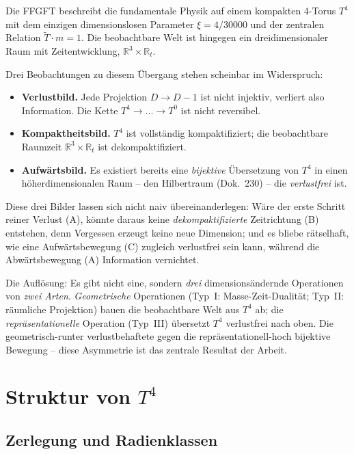 Die FFGFT beschreibt die fundamentale Physik auf einem kompakten 4-Torus $T^4$
mit dem einzigen dimensionslosen Parameter $\xi = 4/30000$ und der zentralen
Relation $\tilde{T}\cdot m = 1$. Die beobachtbare Welt ist hingegen ein
dreidimensionaler Raum mit Zeitentwicklung, $\mathbb{R}^3 \times \mathbb{R}_t$.

Drei Beobachtungen zu diesem \"Ubergang stehen scheinbar im Widerspruch:
\begin{itemize}
  \item[(A)] \textbf{Verlustbild.} Jede Projektion $D{\to}D{-}1$ ist nicht
  injektiv, verliert also Information. Die Kette $T^4 \to \dots \to T^0$ ist
  nicht reversibel.
  \item[(B)] \textbf{Kompaktheitsbild.} $T^4$ ist vollst\"andig kompaktifiziert;
  die beobachtbare Raumzeit $\mathbb{R}^3 \times \mathbb{R}_t$ ist
  dekompaktifiziert.
  \item[(C)] \textbf{Aufw\"artsbild.} Es existiert bereits eine \emph{bijektive}
  \"Ubersetzung von $T^4$ in einen h\"oherdimensionalen Raum -- den Hilbertraum
  (Dok.~230) -- die \emph{verlustfrei} ist.
\end{itemize}

Diese drei Bilder lassen sich nicht naiv \"ubereinanderlegen: W\"are der erste
Schritt reiner Verlust (A), k\"onnte daraus keine \emph{dekompaktifizierte}
Zeitrichtung (B) entstehen, denn Vergessen erzeugt keine neue Dimension; und es
bliebe r\"atselhaft, wie eine Aufw\"artsbewegung (C) zugleich verlustfrei sein
kann, w\"ahrend die Abw\"artsbewegung (A) Information vernichtet.

Die Aufl\"osung: Es gibt nicht eine, sondern \emph{drei} dimensions\"andernde
Operationen von \emph{zwei Arten}. \emph{Geometrische} Operationen (Typ~I:
Masse-Zeit-Dualit\"at; Typ~II: r\"aumliche Projektion) bauen die beobachtbare
Welt aus $T^4$ ab; die \emph{repr\"asentationelle} Operation (Typ~III)
\"ubersetzt $T^4$ verlustfrei nach oben. Die geometrisch-runter verlustbehaftete
gegen die repr\"asentationell-hoch bijektive Bewegung -- diese Asymmetrie ist das
zentrale Resultat der Arbeit.

\section{Struktur von $T^4$}

\subsection{Zerlegung und Radienklassen}

